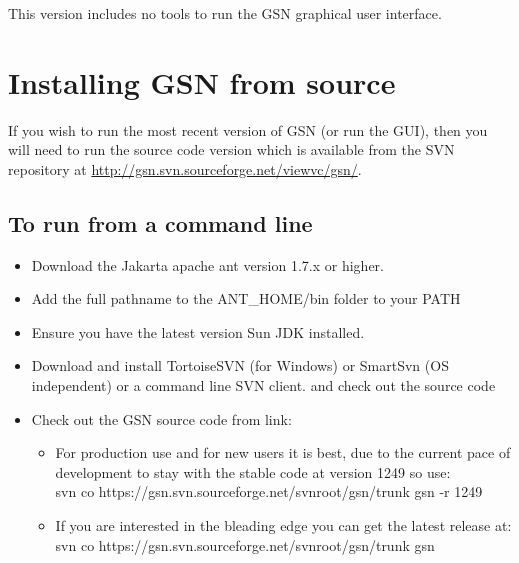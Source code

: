 This version includes no tools to run the GSN graphical user interface.

\section{Installing GSN from source}

If you wish to run the most recent version of GSN (or run the GUI), then you will need to run the source code version which is available from the SVN repository at \url{http://gsn.svn.sourceforge.net/viewvc/gsn/}.

\subsection{To run from a command line}

\begin{itemize}
	\item Download the Jakarta apache ant version 1.7.x or higher.
	\item Add the full pathname to the ANT\_HOME/bin folder to your PATH
	\item Ensure you have the latest version Sun JDK installed.
	\item Download and install TortoiseSVN (for Windows) or SmartSvn (OS
independent) or a command line SVN client. and check out the source code
	\item Check out the GSN source code from link:
	\begin{itemize}
	\item For production use and for new users it is best, due to the current pace of development to stay with the stable code at version 1249 so use:\\
	svn co https://gsn.svn.sourceforge.net/svnroot/gsn/trunk gsn -r 1249
	\item If you are interested in the bleading edge you can get the latest release at:\\
	svn co https://gsn.svn.sourceforge.net/svnroot/gsn/trunk gsn
\end{itemize}
\end{itemize}

